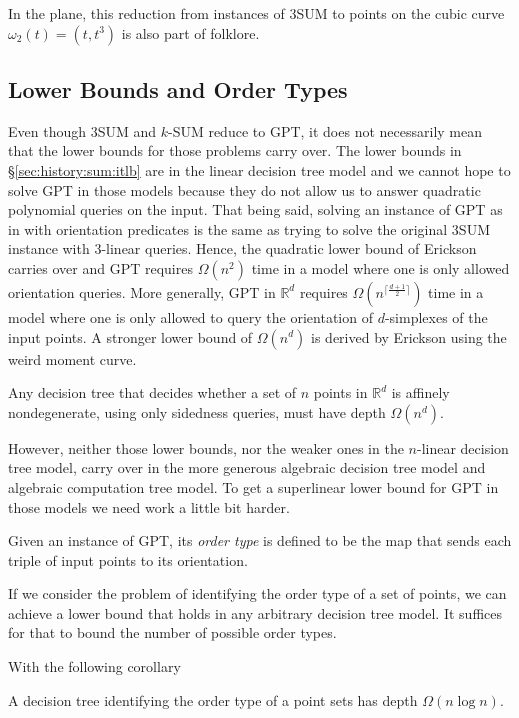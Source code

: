 In the plane, this reduction from instances of 3SUM to points on
the cubic curve \(\omega_2(t) = (t, t^3)\) is also part of folklore.

\subsection{Lower Bounds and Order Types}%
\label{sec:history:pol:lb}

Even though 3SUM and \(k\)-SUM reduce to GPT, it does not necessarily mean that
the lower bounds for those problems carry over.
%
The lower bounds in
\S\ref{sec:history:sum:itlb} are in the linear decision tree model and we
cannot hope to solve GPT in those models because they do not allow us to answer
quadratic polynomial queries on the input.
%
That being said, solving an instance of GPT as in  with
orientation predicates is the same as trying to solve the original 3SUM
instance with \(3\)-linear queries. Hence, the quadratic lower bound of
Erickson~\cite{Er99a} carries over and GPT requires \(\Omega(n^2)\) time in a
model where one is only allowed orientation queries. More generally, GPT in
\(\mathbb{R}^d\) requires \(\Omega(n^{\lceil \frac{d+1}{2} \rceil})\) time in a
model where one is only allowed to query the orientation of \(d\)-simplexes of
the input points.
%
A stronger lower bound of \(\Omega(n^d)\) is derived by Erickson using the
weird moment curve.
\begin{lemma}[%
    name={Erickson~\cite[Theorem~7.1]{Er99b}}
]
Any decision tree that decides whether a set of \(n\) points in
\(\mathbb{R}^d\) is affinely nondegenerate, using only sidedness queries, must
have depth \(\Omega(n^d)\).
\end{lemma}

However, neither those lower bounds, nor the weaker ones in the \(n\)-linear
decision tree model, carry over in the more generous algebraic decision
tree model and algebraic computation tree model.
%
To get a superlinear lower bound for GPT in those models we need work a little
bit harder.

Given an instance of GPT, its \emph{order type} is defined to be the map that
sends each triple of input points to its orientation.
%

%
If we consider the problem of identifying the order type of a set of points, we
can achieve a lower bound that holds in any arbitrary decision tree model. It
suffices for that to bound the number of possible order types.
%

%
With the following corollary
\begin{corollary}
    A decision tree identifying the order type of a point sets has depth
    \(\Omega(n \log n)\).
\end{corollary}

